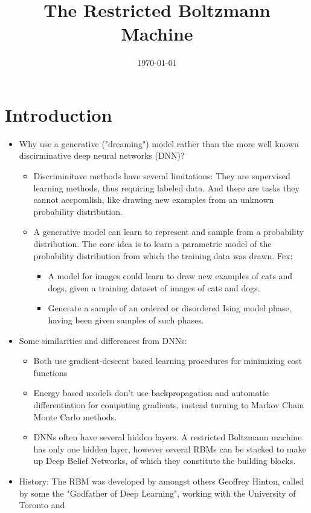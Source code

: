 \documentclass[norsk,a4paper,11pt]{article}
\title{The Restricted Boltzmann Machine}
\begin{document}
\date{\today}
\maketitle


\section{Introduction}
\begin{itemize}
	\item Why use a generative ("dreaming") model rather than the more well known discirminative deep neural networks (DNN)? 
	\begin{itemize}
		\item Discriminitave methods have several limitations: They are supervised learning methods, thus requiring labeled data. And there are tasks they cannot accpomlish, like drawing new examples from an unknown probability distribution.
		\item A generative model can learn to represent and sample from a probability distribution. The core idea is to learn a parametric model of the probability distribution from which the training data was drawn. Fex: 
		\begin{itemize}
			\item A model for images could learn to draw new examples of cats and dogs, given a training dataset of images of cats and dogs.
			\item Generate a sample of an ordered or disordered Ising model phase, having been given samples of such phases.
		\end{itemize}
	\end{itemize}
	\item Some similarities and differences from DNNs:
	\begin{itemize}
		\item Both use gradient-descent based learning procedures for minimizing cost functions
		\item Energy based models don't use backpropagation and automatic differentiation for computing gradients, instead turning to Markov Chain Monte Carlo methods.
		\item DNNs often have several hidden layers. A restricted Boltzmann machine has only one hidden layer, however several RBMs can be stacked to make up Deep Belief Networks, of which they constitute the building blocks.
	\end{itemize}
	\item History: The RBM was developed by amongst others Geoffrey Hinton, called by some the "Godfather of Deep Learning", working with the University of Toronto and
\end{itemize}
\end{document}

